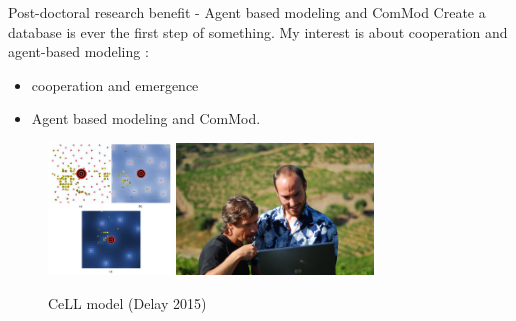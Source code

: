 \documentclass[newPxFont]{beamer}
\begin{document}
\begin{frame}[c]{Post-doctoral research benefit - Agent based modeling and ComMod}
\vspace{-2em}
Create a database is ever the first step of something. My interest is about cooperation and agent-based modeling :
\begin{itemize}
  \item cooperation and emergence
  \item Agent based modeling and ComMod.
\end{itemize}
\begin{figure}
	\centering
	\includegraphics[height = 3.5cm]{img/CeLL_delay2015}
  \includegraphics[height = 3.5cm]{img/fielWdelay}
  \caption{\small{CeLL model (Delay 2015)}}
\end{figure}
\end{frame}
\end{document}
